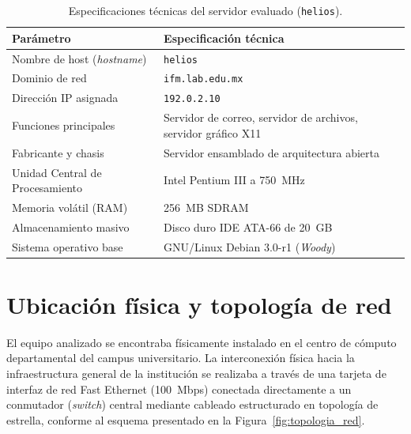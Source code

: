 \begin{table}[htbp]
\centering
\small
\begin{tabularx}{\textwidth}{@{} l X @{}}
\toprule
\textbf{Parámetro} & \textbf{Especificación técnica} \\
\midrule
Nombre de host (\textit{hostname}) & \texttt{helios} \\
Dominio de red & \texttt{ifm.lab.edu.mx} \\
Dirección IP asignada & \texttt{192.0.2.10} \\
Funciones principales & Servidor de correo, servidor de archivos, servidor gráfico X11 \\
Fabricante y chasis & Servidor ensamblado de arquitectura abierta \\
Unidad Central de Procesamiento & Intel Pentium III a 750~MHz \\
Memoria volátil (RAM) & 256~MB SDRAM \\
Almacenamiento masivo & Disco duro IDE ATA-66 de 20~GB \\
Sistema operativo base & GNU/Linux Debian 3.0-r1 (\textit{Woody}) \\
\bottomrule
\end{tabularx}
\caption{Especificaciones técnicas del servidor evaluado (\texttt{helios}).}
\label{tab:ficha_victima1}
\end{table}

\section{Ubicación física y topología de red}

El equipo analizado se encontraba físicamente instalado en el centro de cómputo departamental del campus universitario. La interconexión física hacia la infraestructura general de la institución se realizaba a través de una tarjeta de interfaz de red Fast Ethernet (100~Mbps) conectada directamente a un conmutador (\textit{switch}) central mediante cableado estructurado en topología de estrella, conforme al esquema presentado en la Figura~\ref{fig:topologia_red}.

